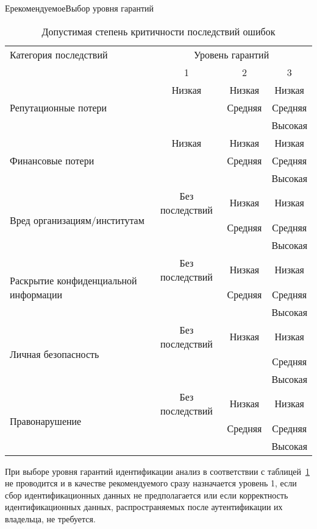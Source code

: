 \begin{appendix}{Е}{рекомендуемое}{Выбор уровня гарантий}
\begin{table}[hbt]
\caption{Допустимая степень критичности последствий ошибок}
\label{Table.AL.Levels}
{\small
\begin{tabular}{|l|c|c|c|}
\hline
Категория последствий & \multicolumn{3}{|c|}{Уровень гарантий}\\
\cline{2-4}
& 1 & 2 & 3\\
\hline
\hline
\multirow{3}{*}{Репутационные потери}
& Низкая & Низкая  & Низкая\\
&        & Средняя & Средняя\\
&        &         & Высокая\\
%
\hline
\multirow{3}{*}{Финансовые потери}
& Низкая & Низкая  & Низкая\\
&        & Средняя & Средняя\\
&        &         & Высокая\\
%
\hline
\multirow{3}{*}{Вред организациям/институтам}
& Без последствий & Низкая  & Низкая\\ 
&                 & Средняя & Средняя\\ 
&                 &         & Высокая\\ 
%
\hline
\multirow{3}{*}{Раскрытие конфиденциальной информации}
& Без последствий & Низкая  & Низкая\\ 
&                 & Средняя & Средняя\\ 
&                 &         & Высокая\\ 
%
\hline
\multirow{3}{*}{Личная безопасность}
& Без последствий & Низкая & Низкая\\ 
&                 &        & Средняя\\ 
&                 &        & Высокая\\ 
%
\hline
\multirow{3}{*}{Правонарушение}
& Без последствий & Низкая  & Низкая\\ 
&                 & Средняя & Средняя\\ 
&                 &         & Высокая\\ 
\hline
\end{tabular}
}
\end{table}

При выборе уровня гарантий идентификации анализ в соответствии с 
таблицей~\ref{Table.AL.Levels} не проводится и в качестве рекомендуемого 
сразу назначается уровень 1, если сбор идентификационных данных не 
предполагается или если корректность идентификационных данных, распространяемых 
после аутентификации их владельца, не требуется.


\end{appendix}
